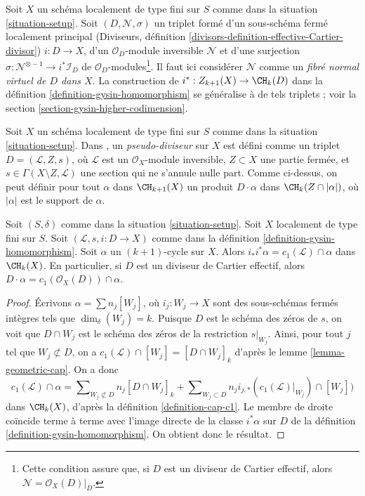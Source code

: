 \begin{remark}
\label{remark-generalize-to-virtual}
Soit $X$ un schéma localement de type fini sur $S$ comme dans la
situation \ref{situation-setup}. Soit $(D, \mathcal{N}, \sigma)$
un triplet formé d'un sous-schéma fermé localement principal (Diviseurs, définition
\ref{divisors-definition-effective-Cartier-divisor})
$i : D \to X$, d'un $\mathcal{O}_D$-module inversible $\mathcal{N}$ et
d'une surjection $\sigma : \mathcal{N}^{\otimes -1} \to i^*\mathcal{I}_D$
de $\mathcal{O}_D$-modules\footnote{Cette condition assure que, si
$D$ est un diviseur de Cartier effectif, alors $\mathcal{N} = \mathcal{O}_X(D)|_D$.}.
Il faut ici considérer $\mathcal{N}$ comme
un {\it fibré normal virtuel de $D$ dans $X$}. La construction de
$i^* : Z_{k + 1}(X) \to \CH_k(D)$ dans la
définition \ref{definition-gysin-homomorphism}
se généralise à de tels triplets ; voir la
section \ref{section-gysin-higher-codimension}.
\end{remark}

\begin{remark}
\label{remark-generalize-to-pseudo-divisor}
Soit $X$ un schéma localement de type fini sur $S$ comme dans la
situation \ref{situation-setup}. Dans \cite{F}, un {\it pseudo-diviseur} sur $X$
est défini comme un triplet $D = (\mathcal{L}, Z, s)$, où $\mathcal{L}$
est un $\mathcal{O}_X$-module inversible, $Z \subset X$ une partie fermée,
et $s \in \Gamma(X \setminus Z, \mathcal{L})$ une section qui ne s'annule
nulle part. Comme ci-dessus, on peut définir pour tout $\alpha$
dans $\CH_{k + 1}(X)$ un produit $D \cdot \alpha$ dans $\CH_k(Z \cap |\alpha|)$,
où $|\alpha|$ est le support de $\alpha$.
\end{remark}

\begin{lemma}
\label{lemma-support-cap-effective-Cartier}
Soit $(S, \delta)$ comme dans la situation \ref{situation-setup}. Soit $X$ localement
de type fini sur $S$. Soit $(\mathcal{L}, s, i : D \to X)$ comme dans la
définition \ref{definition-gysin-homomorphism}. Soit $\alpha$ un
$(k + 1)$-cycle sur $X$. Alors $i_*i^*\alpha = c_1(\mathcal{L}) \cap \alpha$
dans $\CH_k(X)$. En particulier, si $D$ est un diviseur de Cartier effectif, alors
$D \cdot \alpha = c_1(\mathcal{O}_X(D)) \cap \alpha$.
\end{lemma}

\begin{proof}
Écrivons $\alpha = \sum n_j[W_j]$, où $i_j : W_j \to X$ sont des sous-schémas fermés
intègres tels que $\dim_\delta(W_j) = k$.
Puisque $D$ est le schéma des zéros de $s$, on voit que $D \cap W_j$ est le schéma des zéros
de la restriction $s|_{W_j}$. Ainsi, pour tout $j$ tel que
$W_j \not \subset D$, on a
$c_1(\mathcal{L}) \cap [W_j] = [D \cap W_j]_k$
d'après le lemme \ref{lemma-geometric-cap}. On a donc
$$
c_1(\mathcal{L}) \cap \alpha
=
\sum\nolimits_{W_j \not \subset D} n_j[D \cap W_j]_k
+
\sum\nolimits_{W_j \subset D}
n_j i_{j, *}(c_1(\mathcal{L})|_{W_j}) \cap [W_j])
$$
dans $\CH_k(X)$, d'après la définition \ref{definition-cap-c1}.
Le membre de droite coïncide terme à terme avec l'image directe de la classe
$i^*\alpha$ sur $D$ de la définition \ref{definition-gysin-homomorphism}.
On obtient donc le résultat.
\end{proof}

